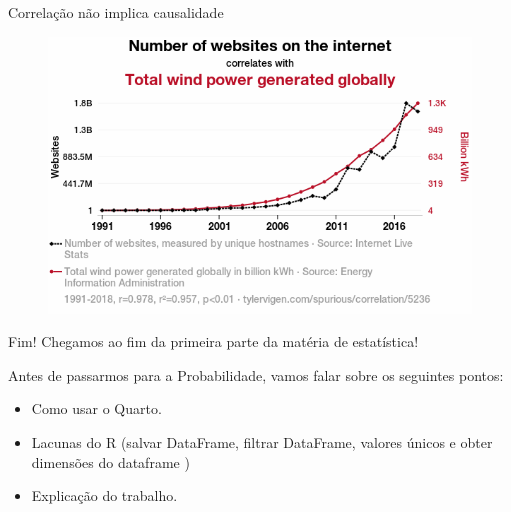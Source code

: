 \begin{frame}{Correlação não implica causalidade}
    \begin{figure}
        \centering
        \includegraphics[width=0.8\linewidth]{figures/5236_number-of-websites-on-the-internet_correlates-with_total-wind-power-generated-globally.png}
    \end{figure}
\end{frame}

\begin{frame}{Fim!}
    Chegamos ao fim da primeira parte da matéria de estatística! 

    \pause

    \vspace{5px}

    Antes de passarmos para a Probabilidade, vamos falar sobre os seguintes pontos:

    \begin{itemize}
        \item Como usar o Quarto. 
        \item Lacunas do R (salvar DataFrame, filtrar DataFrame, valores únicos e obter dimensões do dataframe )
        \item Explicação do trabalho. 
    \end{itemize}
\end{frame}
